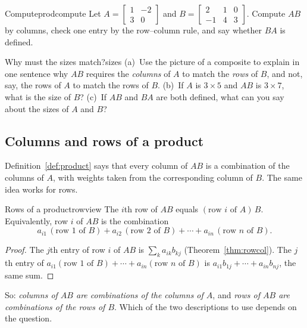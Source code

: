 \documentclass[11pt]{article}
\begin{document}
\begin{kc}{Compute}{prodcompute}
Let $A=\begin{bmatrix}1&-2\\3&0\end{bmatrix}$ and $B=\begin{bmatrix}2&1&0\\-1&4&3\end{bmatrix}$. Compute $AB$ by columns, check one entry by the row--column rule, and say whether $BA$ is defined.
\end{kc}

\begin{think}{Why must the sizes match?}{sizes}
(a)~Use the picture of a composite to explain in one sentence why $AB$ requires the \emph{columns} of $A$ to match the \emph{rows} of $B$, and not, say, the rows of $A$ to match the rows of $B$. (b)~If $A$ is $3\times5$ and $AB$ is $3\times7$, what is the size of $B$? (c)~If $AB$ and $BA$ are both defined, what can you say about the sizes of $A$ and $B$?
\end{think}

\subsection*{Columns and rows of a product}

Definition~\ref{def:product} says that every column of $AB$ is a combination of the columns of $A$, with weights taken from the corresponding column of $B$. The same idea works for rows.

\begin{thm}{Rows of a product}{rowview}
The $i$th row of $AB$ equals $(\text{row } i \text{ of } A)\,B$. Equivalently, row $i$ of $AB$ is the combination
\[
a_{i1}\,(\text{row }1\text{ of }B)+a_{i2}\,(\text{row }2\text{ of }B)+\cdots+a_{in}\,(\text{row }n\text{ of }B).
\]
\end{thm}

\begin{proof}
The $j$th entry of row $i$ of $AB$ is $\sum_k a_{ik}b_{kj}$ (Theorem~\ref{thm:rowcol}). The $j$th entry of $a_{i1}(\text{row }1\text{ of }B)+\cdots+a_{in}(\text{row }n\text{ of }B)$ is $a_{i1}b_{1j}+\cdots+a_{in}b_{nj}$, the same sum.
\end{proof}

So: \emph{columns of $AB$ are combinations of the columns of $A$}, and \emph{rows of $AB$ are combinations of the rows of $B$}. Which of the two descriptions to use depends on the question.
\end{document}
